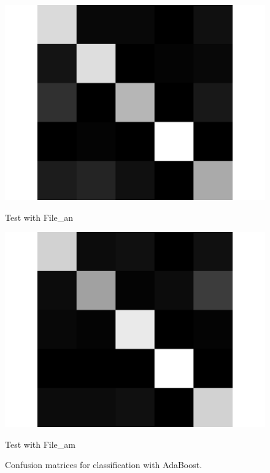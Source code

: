 \documentclass[letterpaper]{article}
\begin{document}
\begin{figure}
\begin{minipage}{.45\linewidth}
   \includegraphics[width=\linewidth]{confusionmatrices/boost_train_am_test_an.png}
   \small\centerline{Test with File\_an}\normalsize
   \end{minipage}
\begin{minipage}{.45\linewidth}
   \includegraphics[width=\linewidth]{confusionmatrices/boost_train_an_test_am.png}
   \small\centerline{Test with File\_am}\normalsize
   \end{minipage}
   \caption{Confusion matrices for classification with AdaBoost.}
\end{figure}
\end{document}
